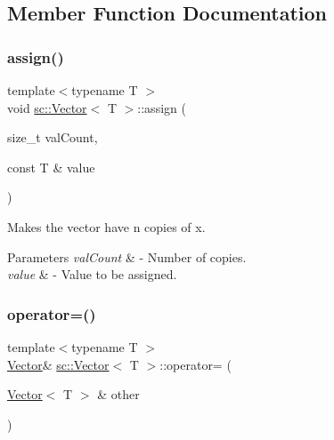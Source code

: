 \subsection{Member Function Documentation}
\mbox{\label{classsc_1_1Vector_a6b349db72f104336fe4bf06dffaa4979}} 
\subsubsection{\texorpdfstring{assign()}{assign()}}
{\footnotesize\ttfamily template$<$typename T $>$ \\
void \hyperlink{classsc_1_1Vector}{sc\+::\+Vector}$<$ T $>$\+::assign (\begin{DoxyParamCaption}\item[{size\+\_\+t}]{val\+Count,  }\item[{const T \&}]{value }\end{DoxyParamCaption})\hspace{0.3cm}{\ttfamily [inline]}}



Makes the vector have n copies of x. 


\begin{DoxyParams}{Parameters}
{\em val\+Count} & -\/ Number of copies. \\
\hline
{\em value} & -\/ Value to be assigned. \\
\hline
\end{DoxyParams}
\mbox{\label{classsc_1_1Vector_ac9e52ae9626207b75d6145d64a23edd6}} 
\subsubsection{\texorpdfstring{operator=()}{operator=()}\hspace{0.1cm}{\footnotesize\ttfamily [1/2]}}
{\footnotesize\ttfamily template$<$typename T $>$ \\
\hyperlink{classsc_1_1Vector}{Vector}\& \hyperlink{classsc_1_1Vector}{sc\+::\+Vector}$<$ T $>$\+::operator= (\begin{DoxyParamCaption}\item[{\hyperlink{classsc_1_1Vector}{Vector}$<$ T $>$ \&}]{other }\end{DoxyParamCaption})\hspace{0.3cm}{\ttfamily [inline]}}



